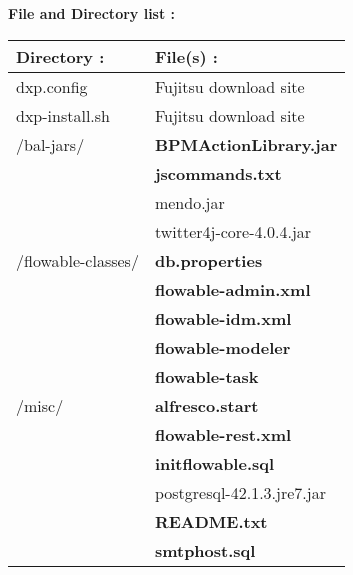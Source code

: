  \begin{center}
	\textbf{File and Directory list :}
	\begin{tabular}{|p{2in}|p{4in}|}
	\hline
	\textbf{Directory :} & \textbf{File(s) :}\\
	\hline
	dxp.config & Fujitsu download site\\
	dxp-install.sh & Fujitsu download site\\
	/bal-jars/ & \textbf{BPMActionLibrary.jar}\\
	& \textbf{jscommands.txt}\\
	& mendo.jar\\
	& twitter4j-core-4.0.4.jar\\
	\hline
	/flowable-classes/ & \textbf{db.properties}\\
	& \textbf{flowable-admin.xml}\\
	& \textbf{flowable-idm.xml}\\
	& \textbf{flowable-modeler}\\
	& \textbf{flowable-task}\\
	\hline
	/misc/ & \textbf{alfresco.start}\\
	& \textbf{flowable-rest.xml}\\
	& \textbf{initflowable.sql}\\
	& postgresql-42.1.3.jre7.jar\\
	& \textbf{README.txt}\\
	& \textbf{smtphost.sql}\\
	\hline
	\end{tabular}
\end{center}
